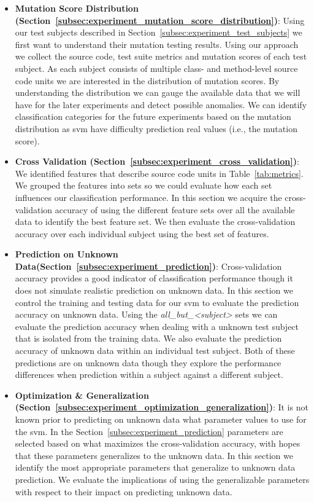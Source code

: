 \begin{itemize}
  \item \textbf{Mutation Score Distribution (Section~\ref{subsec:experiment_mutation_score_distribution})}: Using our test subjects described in Section~\ref{subsec:experiment_test_subjects} we first want to understand their mutation testing results. Using our approach we collect the source code, test suite metrics and mutation scores of each test subject. As each subject consists of multiple class- and method-level source code units we are interested in the distribution of mutation scores. By understanding the distribution we can gauge the available data that we will have for the later experiments and detect possible anomalies. We can identify classification categories for the future experiments based on the mutation distribution as \gls{svm} have difficulty prediction real values (i.e., the mutation score).
  \item \textbf{Cross Validation (Section~\ref{subsec:experiment_cross_validation})}: We identified features that describe source code units in Table~\ref{tab:metrics}. We grouped the features into sets so we could evaluate how each set influences our classification performance. In this section we acquire the cross-validation accuracy of using the different feature sets over all the available data to identify the best feature set. We then evaluate the cross-validation accuracy over each individual subject using the best set of features.
  \item \textbf{Prediction on Unknown Data(Section~\ref{subsec:experiment_prediction})}: Cross-validation accuracy provides a good indicator of classification performance though it does not simulate realistic prediction on unknown data. In this section we  control the training and testing data for our \gls{svm} to evaluate the prediction accuracy on unknown data. Using the \emph{all\_but\_<subject>} sets we can evaluate the prediction accuracy when dealing with a unknown test subject that is isolated from the training data. We also evaluate the prediction accuracy of unknown data within an individual test subject. Both of these predictions are on unknown data though they explore the performance differences when prediction within a subject against a different subject.
  \item \textbf{Optimization \& Generalization (Section~\ref{subsec:experiment_optimization_generalization})}: It is not known prior to predicting on unknown data what parameter values to use for the \gls{svm}. In the Section~\ref{subsec:experiment_prediction} parameters are selected based on what maximizes the cross-validation accuracy, with hopes that these parameters generalizes to the unknown data. In this section we identify the most appropriate parameters that generalize to unknown data prediction. We evaluate the implications of using the generalizable parameters with respect to their impact on predicting unknown data.

\end{itemize}
